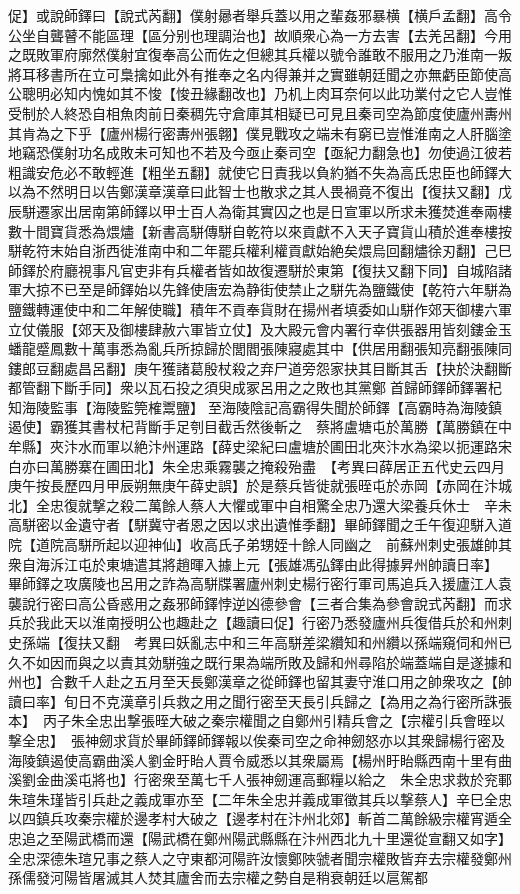 促】或說師鐸曰【說式芮翻】僕射曏者舉兵蓋以用之輩姦邪暴横【横戶孟翻】高令公坐自聾瞽不能區理【區分别也理調治也】故順衆心為一方去害【去羌呂翻】今用之既敗軍府廓然僕射宜復奉高公而佐之但總其兵權以號令誰敢不服用之乃淮南一叛將耳移書所在立可梟擒如此外有推奉之名内得兼并之實雖朝廷聞之亦無虧臣節使高公聰明必知内愧如其不悛【悛丑緣翻改也】乃机上肉耳奈何以此功業付之它人豈惟受制於人終恐自相魚肉前日秦稠先守倉庫其相疑已可見且秦司空為節度使廬州夀州其肯為之下乎【廬州楊行密夀州張翺】僕見戰攻之端未有窮已豈惟淮南之人肝腦塗地竊恐僕射功名成敗未可知也不若及今亟止秦司空【亟紀力翻急也】勿使過江彼若粗識安危必不敢輕進【粗坐五翻】就使它日責我以負約猶不失為高氏忠臣也師鐸大以為不然明日以告鄭漢章漢章曰此智士也散求之其人畏禍竟不復出【復扶又翻】戊辰駢遷家出居南第師鐸以甲士百人為衛其實囚之也是日宣軍以所求未獲焚進奉兩樓數十間寶貨悉為煨燼【新書高駢傳駢自乾符以來貢獻不入天子寶貨山積於進奉樓按駢乾符末始自浙西徙淮南中和二年罷兵權利權貢獻始絶矣煨烏回翻燼徐刃翻】己巳師鐸於府廳視事凡官吏非有兵權者皆如故復遷駢於東第【復扶又翻下同】自城陷諸軍大掠不已至是師鐸始以先鋒使唐宏為静街使禁止之駢先為鹽鐵使【乾符六年駢為鹽鐵轉運使中和二年解使職】積年不貢奉貨財在揚州者填委如山駢作郊天御樓六軍立仗儀服【郊天及御樓肆赦六軍皆立仗】及大殿元會内署行幸供張器用皆刻鏤金玉蟠龍蹙鳳數十萬事悉為亂兵所掠歸於閭閻張陳寢處其中【供居用翻張知亮翻張陳同鏤郎豆翻處昌呂翻】庚午獲諸葛殷杖殺之弃尸道旁怨家抉其目斷其舌【抉於決翻斷都管翻下斷手同】衆以瓦石投之須臾成冢呂用之之敗也其黨鄭首歸師鐸師鐸署杞知海陵監事【海陵監筦榷鬻鹽】至海陵陰記高霸得失聞於師鐸【高霸時為海陵鎮遏使】霸獲其書杖杞背斷手足刳目截舌然後斬之　蔡將盧塘屯於萬勝【萬勝鎮在中牟縣】夾汴水而軍以絶汴州運路【薛史梁紀曰盧塘於圃田北夾汴水為梁以扼運路宋白亦曰萬勝寨在圃田北】朱全忠乘霧襲之掩殺殆盡　【考異曰薛居正五代史云四月庚午按長歷四月甲辰朔無庚午薛史誤】於是蔡兵皆徙就張晊屯於赤岡【赤岡在汴城北】全忠復就撃之殺二萬餘人蔡人大懼或軍中自相驚全忠乃還大梁養兵休士　辛未高駢密以金遺守者【駢冀守者恩之因以求出遺惟季翻】畢師鐸聞之壬午復迎駢入道院【道院高駢所起以迎神仙】收高氏子弟甥姪十餘人同幽之　前蘇州刺史張雄帥其衆自海泝江屯於東塘遣其將趙暉入據上元【張雄馮弘鐸由此得據昇州帥讀日率】　畢師鐸之攻廣陵也呂用之詐為高駢牒署廬州刺史楊行密行軍司馬追兵入援廬江人袁襲說行密曰高公昏惑用之姦邪師鐸悖逆凶德參會【三者合集為參會說式芮翻】而求兵於我此天以淮南授明公也趣赴之【趣讀曰促】行密乃悉發廬州兵復借兵於和州刺史孫端【復扶又翻　考異曰妖亂志中和三年高駢差梁纘知和州纘以孫端窺伺和州已久不如因而與之以責其効駢強之既行果為端所敗及歸和州尋陷於端蓋端自是遂據和州也】合數千人赴之五月至天長鄭漢章之從師鐸也留其妻守淮口用之帥衆攻之【帥讀曰率】旬日不克漢章引兵救之用之聞行密至天長引兵歸之【為用之為行密所誅張本】　丙子朱全忠出撃張晊大破之秦宗權聞之自鄭州引精兵會之【宗權引兵會晊以撃全忠】　張神劒求貨於畢師鐸師鐸報以俟秦司空之命神劒怒亦以其衆歸楊行密及海陵鎮遏使高霸曲溪人劉金盱眙人賈令威悉以其衆屬焉【楊州盱眙縣西南十里有曲溪劉金曲溪屯將也】行密衆至萬七千人張神劒運高郵糧以給之　朱全忠求救於兖鄆朱瑄朱瑾皆引兵赴之義成軍亦至【二年朱全忠并義成軍徵其兵以撃蔡人】辛巳全忠以四鎮兵攻秦宗權於邊孝村大破之【邊孝村在汴州北郊】斬首二萬餘級宗權宵遁全忠追之至陽武橋而還【陽武橋在鄭州陽武縣縣在汴州西北九十里還從宣翻又如字】全忠深德朱瑄兄事之蔡人之守東都河陽許汝懷鄭陜虢者聞宗權敗皆弃去宗權發鄭州孫儒發河陽皆屠滅其人焚其廬舍而去宗權之勢自是稍衰朝廷以扈駕都